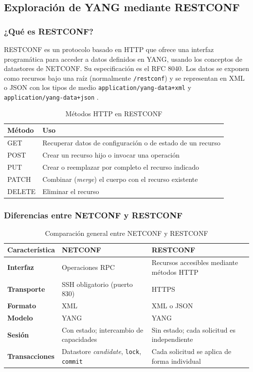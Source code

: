 \subsection{Exploración de YANG mediante RESTCONF}

\subsubsection{¿Qué es RESTCONF?}
RESTCONF es un protocolo basado en HTTP que ofrece una interfaz programática para acceder a datos definidos en YANG, usando los conceptos de datastores de NETCONF. Su especificación es el RFC 8040. Los datos se exponen como recursos bajo una raíz (normalmente \texttt{/restconf}) y se representan en XML o JSON con los tipos de medio \texttt{application/yang-data+xml} y \texttt{application/yang-data+json} \parencite{rfc8040,rfc7951}.

\begin{table}[H]
\centering
\caption{Métodos HTTP en RESTCONF \parencite{rfc8040}}
\begin{tabularx}{\textwidth}{p{2.2cm}X}
\toprule
\textbf{Método} & \textbf{Uso} \\
\midrule
GET & Recuperar datos de configuración o de estado de un recurso \\
POST & Crear un recurso hijo o invocar una operación \\
PUT & Crear o reemplazar por completo el recurso indicado \\
PATCH & Combinar (\textit{merge}) el cuerpo con el recurso existente \\
DELETE & Eliminar el recurso \\
\bottomrule
\end{tabularx}
\end{table}

\subsubsection{Diferencias entre NETCONF y RESTCONF}
\begin{table}[H]
\centering
\caption{Comparación general entre NETCONF y RESTCONF}
\begin{tabularx}{\textwidth}{>{\bfseries}p{3cm}XX}
\toprule
Característica & NETCONF & RESTCONF \\
\midrule
Interfaz & Operaciones RPC & Recursos accesibles mediante métodos HTTP \\
Transporte & SSH obligatorio (puerto 830) & HTTPS \\
Formato & XML & XML o JSON \\
Modelo & YANG & YANG \\
Sesión & Con estado; intercambio de capacidades & Sin estado; cada solicitud es independiente \\
Transacciones & Datastore \textit{candidate}, \texttt{lock}, \texttt{commit} & Cada solicitud se aplica de forma individual \\
\bottomrule
\end{tabularx}
\end{table}

